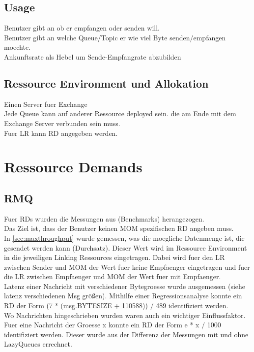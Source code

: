 \subsection{Usage}
Benutzer gibt an ob er empfangen oder senden will. \\
Benutzer gibt an welche Queue/Topic er wie viel Byte senden/empfangen moechte. \\
Ankunftsrate als Hebel um Sende-Empfangrate abzubilden \\
\subsection{Ressource Environment und Allokation}
Einen Server fuer Exchange \\
Jede Queue kann auf anderer Ressource deployed sein. die am Ende mit dem Exchange Server verbunden sein muss.\\
Fuer LR kann RD angegeben werden.

\section{Ressource Demands}
\subsection{RMQ}
\label{sec:rmqRd}
Fuer RDs wurden die Messungen aus (Benchmarks) herangezogen. \\ 
Das Ziel ist, dass der Benutzer keinen MOM spezifischen RD angeben muss. \\
In \autoref{sec:maxthroughput} wurde gemessen, was die moegliche Datenmenge ist, die gesendet werden kann (Durchsatz). Dieser Wert wird im Ressource Environment in die jeweiligen Linking Ressources eingetragen. Dabei wird fuer den LR zwischen Sender und MOM der Wert fuer keine Empfaenger eingetragen und fuer die LR zwischen Empfaenger und MOM der Wert fuer mit Empfaenger. \\

Latenz einer Nachricht mit verschiedener Bytegroesse wurde ausgemessen (siehe latenz verschiedenen Msg größen). Mithilfe einer Regressionsanalyse konnte ein RD der Form (7 * (msg.BYTESIZE + 110588)) / 489 identifiziert werden.\\

Wo Nachrichten hingeschrieben wurden waren auch ein wichtiger Einflussfaktor. Fuer eine Nachricht der Groesse x konnte ein RD der Form e * x / 1000 identifiziert werden. Dieser wurde aus der Differenz der Messungen mit und ohne LazyQueues errechnet. \\

